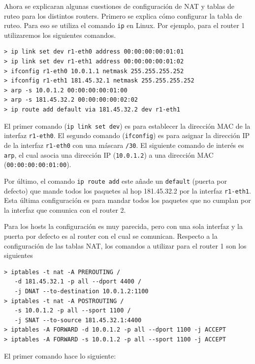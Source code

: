Ahora se explicaran algunas cuestiones de configuración de NAT y tablas de ruteo para los distintos routers. Primero se explica cómo configurar la tabla de ruteo. Para eso se utiliza el comando \texttt{ip} en Linux. Por ejemplo, para el router 1 utilizaremos los siguientes comandos.

\begin{verbatim}
> ip link set dev r1-eth0 address 00:00:00:00:01:01
> ip link set dev r1-eth1 address 00:00:00:00:01:02
> ifconfig r1-eth0 10.0.1.1 netmask 255.255.255.252
> ifconfig r1-eth1 181.45.32.1 netmask 255.255.255.252
> arp -s 10.0.1.2 00:00:00:00:01:00
> arp -s 181.45.32.2 00:00:00:00:02:02
> ip route add default via 181.45.32.2 dev r1-eth1
\end{verbatim}

El primer comando (\texttt{ip link set dev}) es para establecer la dirección MAC de la interfaz \texttt{r1-eth0}. El segundo comando (\texttt{ifconfig}) es para asignar la dirección IP de la interfaz \texttt{r1-eth0} con una máscara \texttt{/30}. El siguiente comando de interés es \texttt{arp}, el cual asocia una dirección IP (\texttt{10.0.1.2}) a una dirección MAC (\texttt{00:00:00:00:01:00}). 

\vspace{0.25cm}

Por último, el comando \texttt{ip route add} este añade un \texttt{default} (puerta por defecto) que mande todos los paquetes al hop 181.45.32.2 por la interfaz \texttt{r1-eth1}. Esta última configuración es para mandar todos los paquetes que no cumplan por la interfaz que comunica con el router 2. 

\vspace{0.25cm}

Para los hosts la configuración es muy parecida, pero con una sola interfaz y la puerta por defecto es al router con el cual se comunican. Respecto a la configuración de las tablas NAT, los comandos a utilizar para el router 1 son los siguientes 

\begin{verbatim}
> iptables -t nat -A PREROUTING / 
   -d 181.45.32.1 -p all --dport 4400 /
   -j DNAT --to-destination 10.0.1.2:1100
> iptables -t nat -A POSTROUTING /
   -s 10.0.1.2 -p all --sport 1100 /
   -j SNAT --to-source 181.45.32.1:4400
> iptables -A FORWARD -d 10.0.1.2 -p all --dport 1100 -j ACCEPT
> iptables -A FORWARD -s 10.0.1.2 -p all --sport 1100 -j ACCEPT
\end{verbatim}

\noindent El primer comando hace lo siguiente:

